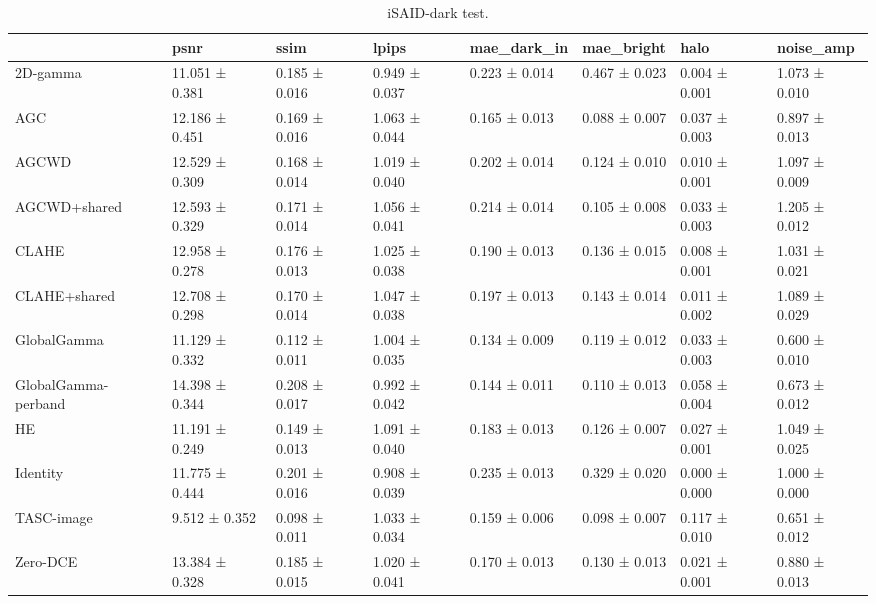 \begin{table}[t]
\caption{iSAID-dark test.}
\label{tab:isaid_summary}
\begin{tabular}{llllllll}
\toprule
 & psnr & ssim & lpips & mae\_dark\_in & mae\_bright & halo & noise\_amp \\
\midrule
2D-gamma & 11.051 ± 0.381 & 0.185 ± 0.016 & 0.949 ± 0.037 & 0.223 ± 0.014 & 0.467 ± 0.023 & 0.004 ± 0.001 & 1.073 ± 0.010 \\
AGC & 12.186 ± 0.451 & 0.169 ± 0.016 & 1.063 ± 0.044 & 0.165 ± 0.013 & 0.088 ± 0.007 & 0.037 ± 0.003 & 0.897 ± 0.013 \\
AGCWD & 12.529 ± 0.309 & 0.168 ± 0.014 & 1.019 ± 0.040 & 0.202 ± 0.014 & 0.124 ± 0.010 & 0.010 ± 0.001 & 1.097 ± 0.009 \\
AGCWD+shared & 12.593 ± 0.329 & 0.171 ± 0.014 & 1.056 ± 0.041 & 0.214 ± 0.014 & 0.105 ± 0.008 & 0.033 ± 0.003 & 1.205 ± 0.012 \\
CLAHE & 12.958 ± 0.278 & 0.176 ± 0.013 & 1.025 ± 0.038 & 0.190 ± 0.013 & 0.136 ± 0.015 & 0.008 ± 0.001 & 1.031 ± 0.021 \\
CLAHE+shared & 12.708 ± 0.298 & 0.170 ± 0.014 & 1.047 ± 0.038 & 0.197 ± 0.013 & 0.143 ± 0.014 & 0.011 ± 0.002 & 1.089 ± 0.029 \\
GlobalGamma & 11.129 ± 0.332 & 0.112 ± 0.011 & 1.004 ± 0.035 & 0.134 ± 0.009 & 0.119 ± 0.012 & 0.033 ± 0.003 & 0.600 ± 0.010 \\
GlobalGamma-perband & 14.398 ± 0.344 & 0.208 ± 0.017 & 0.992 ± 0.042 & 0.144 ± 0.011 & 0.110 ± 0.013 & 0.058 ± 0.004 & 0.673 ± 0.012 \\
HE & 11.191 ± 0.249 & 0.149 ± 0.013 & 1.091 ± 0.040 & 0.183 ± 0.013 & 0.126 ± 0.007 & 0.027 ± 0.001 & 1.049 ± 0.025 \\
Identity & 11.775 ± 0.444 & 0.201 ± 0.016 & 0.908 ± 0.039 & 0.235 ± 0.013 & 0.329 ± 0.020 & 0.000 ± 0.000 & 1.000 ± 0.000 \\
TASC-image & 9.512 ± 0.352 & 0.098 ± 0.011 & 1.033 ± 0.034 & 0.159 ± 0.006 & 0.098 ± 0.007 & 0.117 ± 0.010 & 0.651 ± 0.012 \\
Zero-DCE & 13.384 ± 0.328 & 0.185 ± 0.015 & 1.020 ± 0.041 & 0.170 ± 0.013 & 0.130 ± 0.013 & 0.021 ± 0.001 & 0.880 ± 0.013 \\
\bottomrule
\end{tabular}
\end{table}
